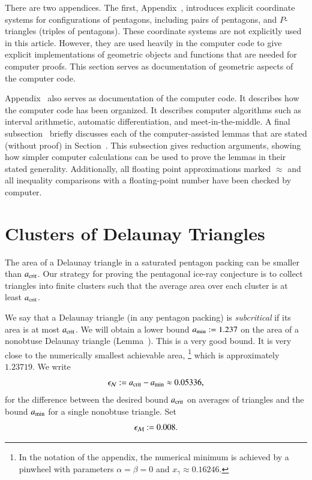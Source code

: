 There are two appendices.  The first, Appendix~,
introduces explicit coordinate systems for configurations of
pentagons, including pairs of pentagons, and $P$-triangles (triples of
pentagons).  These coordinate systems are not explicitly used in this
article.  However, they are used heavily in the computer code to give
explicit implementations of geometric objects and functions that are
needed for computer proofs.  This section serves as
documentation of geometric aspects of the computer code.

Appendix~ also serves as documentation of the
computer code.  It describes how the computer code has been
organized. It describes computer algorithms such as interval
arithmetic, automatic differentiation, and meet-in-the-middle.  A
final subsection~ briefly discusses each of the
computer-assisted lemmas that are stated (without proof) in
Section~.  This subsection gives reduction arguments,
showing how simpler computer calculations can be used to prove the
lemmas in their stated generality.
Additionally, all floating point
approximations marked $\approx$ and all inequality comparisons with a floating-point number have been checked by computer.

\section{Clusters of Delaunay Triangles}

The area of a Delaunay triangle in a saturated pentagon packing can be
smaller than $a_\text{crit}$.  Our strategy for proving the pentagonal
ice-ray conjecture is to collect triangles into finite clusters such
that the average area over each cluster is at least $a_\text{crit}$.

We say that a Delaunay triangle (in any pentagon packing) is {\it
  subcritical} if its area is at most $a_\text{crit}$.  We will obtain a
lower bound $a_\text{min} := 1.237$ on the area of a nonobtuse Delaunay
triangle (Lemma~).  This is a very good bound.  It is
very close to the numerically smallest achievable area,%
\footnote{In the notation of the appendix, the
  numerical minimum is achieved by a pinwheel with parameters
  $\alpha=\beta=0$ and $x_\gamma\approx 0.16246$.}
 which is
approximately $1.23719$.  We write 
\begin{equation}\libel{eqn:epsN}
\epsN :=
\acrit - \ao \approx 0.05336,
\end{equation} for the difference between the desired
bound $a_\text{crit}$ on averages of triangles and the bound $a_\text{min}$ for a
single nonobtuse triangle.  Set
\begin{equation}\libel{eqn:epsM}
\epsM := 0.008.
\end{equation}

